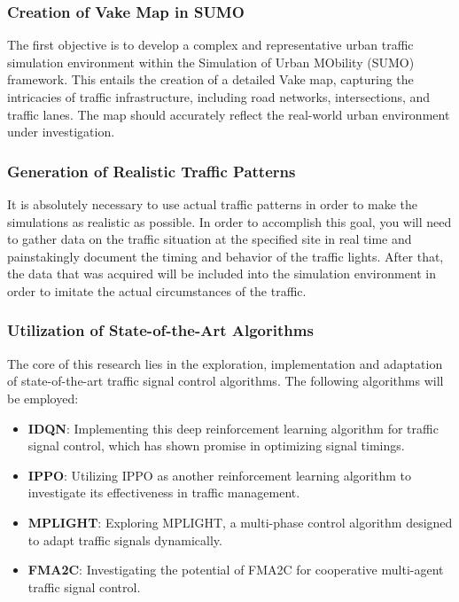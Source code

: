 \subsubsection{Creation of Vake Map in SUMO}
The first objective is to develop a complex and representative urban traffic simulation environment within the Simulation of Urban MObility (SUMO) framework. This entails the creation of a detailed Vake map, capturing the intricacies of traffic infrastructure, including road networks, intersections, and traffic lanes. The map should accurately reflect the real-world urban environment under investigation.

\subsubsection{Generation of Realistic Traffic Patterns}
It is absolutely necessary to use actual traffic patterns in order to make the simulations as realistic as possible. In order to accomplish this goal, you will need to gather data on the traffic situation at the specified site in real time and painstakingly document the timing and behavior of the traffic lights. After that, the data that was acquired will be included into the simulation environment in order to imitate the actual circumstances of the traffic.

\subsubsection{Utilization of State-of-the-Art Algorithms}
The core of this research lies in the exploration, implementation and adaptation of state-of-the-art traffic signal control algorithms. The following algorithms will be employed:

\begin{itemize}
  \item \textbf{IDQN}: Implementing this deep reinforcement learning algorithm for traffic signal control, which has shown promise in optimizing signal timings.
  
  \item \textbf{IPPO}: Utilizing IPPO as another reinforcement learning algorithm to investigate its effectiveness in traffic management.
  
  \item \textbf{MPLIGHT}: Exploring MPLIGHT, a multi-phase control algorithm designed to adapt traffic signals dynamically.
  
  \item \textbf{FMA2C}: Investigating the potential of FMA2C for cooperative multi-agent traffic signal control.
\end{itemize}

